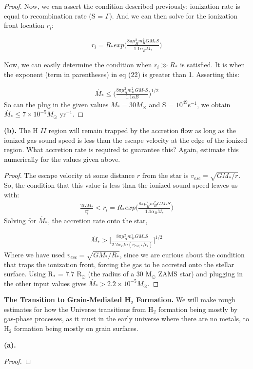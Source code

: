 \documentclass[10pt]{article}
\newenvironment{problem}[2][Problem]{\begin{trivlist}
\item[\hskip \labelsep {\bfseries #1}\hskip \labelsep {\bfseries #2.}]}{\end{trivlist}}
\begin{document}
\begin{proof}
Now, we can assert the condition described previously: ionization rate is equal to recombination rate (S = $\Gamma$). And we can then solve for the ionization front location $r_{i}$:

\begin{align}
r_{i} = R_{*}exp\bigg(\frac{8\pi\mu_{H}^2 m_{H}^2 GM_{*}S}{1.1\alpha_{B}\dot{M_{*}}}\bigg)
\end{align}

Now, we can easily determine the condition when $r_{i} \gg R_{*}$ is satisfied. It is when the exponent (term in parentheses) in eq (22) is greater than 1. Asserting this:

\begin{align}
\dot{M_{*}} \leq \Bigg(\frac{8\pi\mu_{H}^2 m_{H}^2 GM_{*}S}{1.1\alpha{B}}\Bigg)^{1/2}
\end{align}
So can the plug in the given values $M_{*} = 30M_{\odot}$ and S = $10^{49}$s$^{-1}$, we obtain $\dot{M_{*}} \leq 7 \times 10^{-5} M_{\odot}$ yr$^{-1}$.

\end{proof}

\noindent\textbf{(b).}
The H $II$ region will remain trapped by the accretion flow as long as the ionized gas sound speed is less than the escape velocity at the edge of the ionized region. What accretion rate is required to guarantee this? Again, estimate this numerically for the values given above.
\begin{proof}
The escape velocity at some distance $r$ from the star is $v_{esc} = \sqrt{GM_{*}/r}$. So, the condition that this value is less than the ionized sound speed leaves us with:
\begin{align}
\frac{2GM_{*}}{c_{i}^2} < r_{i} = R_{*}exp\bigg(\frac{8\pi\mu_{H}^2 m_{H}^2 GM_{*}S}{1.1\alpha_{B}\dot{M_{*}}}\bigg)
\end{align}
Solving for $\dot{M_{*}}$, the accretion rate onto the star,

\begin{align}
\dot{M_{*}} > \Bigg[\frac{8\pi\mu_{H}^2 m_{H}^2GM_{*}S}{2.2\alpha_{B}ln(v_{esc,*}/c_{i})} \Bigg]^{1/2}
\end{align}
Where we have used $v_{esc} = \sqrt{GM_{*}/R_{*}}$, since we are curious about the condition that traps the ionization front, forcing the gas to be accreted onto the stellar surface. Using R$_{*}$ = 7.7 R$_{\odot}$ (the radius of a 30 M$_{\odot}$ ZAMS star) and plugging in the other input values gives $\dot{M_{*}} > 2.2 \times 10^{-5} M_{\odot}$.

\end{proof}

\begin{problem}{5.2}
\textbf{The Transition to Grain-Mediated H$_{2}$ Formation.}
We will make rough estimates for how the Universe transitions from H$_{2}$ formation being mostly by gas-phase processes, as it must in the early universe where there are no metals, to H$_{2}$ formation being mostly on grain surfaces. 
\end{problem}
\noindent\textbf{(a).}
\begin{proof}

\end{proof}
\end{document}
